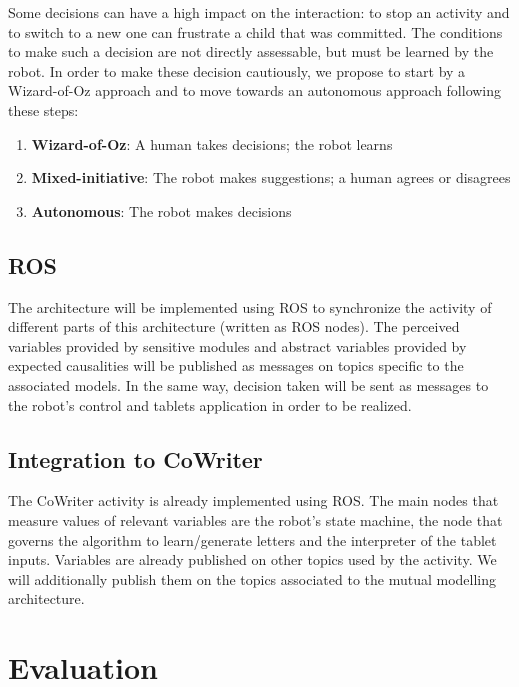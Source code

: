 \documentclass[10pt,a4paper]{article}
\begin{document}
Some decisions can have a high impact on the interaction: to stop an activity and to switch to a new one can frustrate a child that was committed. 
The conditions to make such a decision are not directly assessable, but must be learned by the robot. In order to make these decision cautiously, we propose to start by a Wizard-of-Oz approach and to move towards an autonomous approach following these steps: 
\begin{enumerate}
\item \textbf{Wizard-of-Oz}: A human takes decisions; the robot learns
\item \textbf{Mixed-initiative}: The robot makes suggestions; a human agrees or disagrees
\item \textbf{Autonomous}: The robot makes decisions
\end{enumerate}


\subsection{ROS} %

The architecture will be implemented using ROS to synchronize the activity of different parts of this architecture (written as ROS nodes). The perceived variables provided by sensitive modules and abstract variables provided by expected causalities will be published as messages on topics specific to the associated models. In the same way, decision taken will be sent as messages to the robot's control and tablets application in order to be realized. 

\subsection{Integration to CoWriter}

The CoWriter activity is already implemented using ROS. The main nodes that measure values of relevant variables are the robot's state machine, the node that governs the algorithm to learn/generate letters and the interpreter of the tablet inputs. Variables are already published on other topics used by the activity. We will additionally publish them on the topics associated to the mutual modelling architecture. 

\section{Evaluation}\label{eval}
\end{document}
